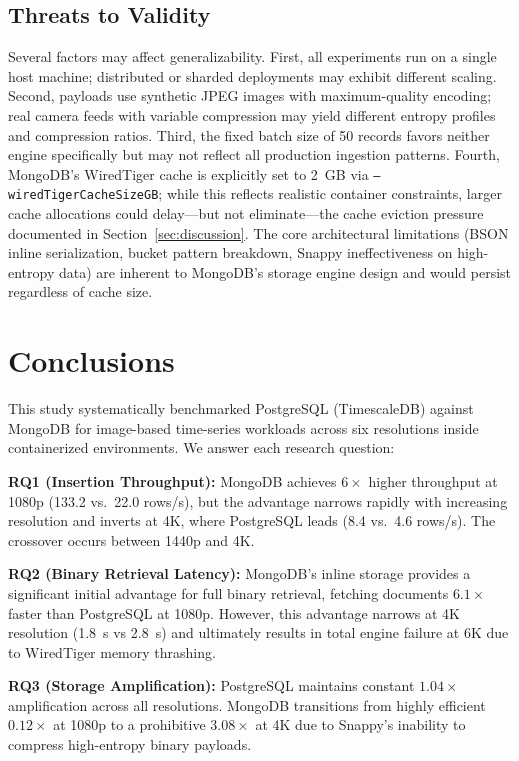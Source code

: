 \documentclass[conference]{IEEEtran}
\begin{document}
\subsection{Threats to Validity}
Several factors may affect generalizability. First, all experiments run on a single host machine; distributed or sharded deployments may exhibit different scaling. Second, payloads use synthetic JPEG images with maximum-quality encoding; real camera feeds with variable compression may yield different entropy profiles and compression ratios. Third, the fixed batch size of 50 records favors neither engine specifically but may not reflect all production ingestion patterns. Fourth, MongoDB's WiredTiger cache is explicitly set to 2~GB via \texttt{--wiredTigerCacheSizeGB}; while this reflects realistic container constraints, larger cache allocations could delay---but not eliminate---the cache eviction pressure documented in Section~\ref{sec:discussion}. The core architectural limitations (BSON inline serialization, bucket pattern breakdown, Snappy ineffectiveness on high-entropy data) are inherent to MongoDB's storage engine design and would persist regardless of cache size.

\section{Conclusions}
\label{sec:conclusions}

This study systematically benchmarked PostgreSQL (TimescaleDB) against MongoDB for image-based time-series workloads across six resolutions inside containerized environments. We answer each research question:

\textbf{RQ1 (Insertion Throughput):} MongoDB achieves $6\times$ higher throughput at 1080p (133.2 vs.\ 22.0 rows/s), but the advantage narrows rapidly with increasing resolution and inverts at 4K, where PostgreSQL leads (8.4 vs.\ 4.6 rows/s). The crossover occurs between 1440p and 4K.

\textbf{RQ2 (Binary Retrieval Latency):} MongoDB's inline storage provides a significant initial advantage for full binary retrieval, fetching documents $6.1\times$ faster than PostgreSQL at 1080p. However, this advantage narrows at 4K resolution (1.8~s vs 2.8~s) and ultimately results in total engine failure at 6K due to WiredTiger memory thrashing.

\textbf{RQ3 (Storage Amplification):} PostgreSQL maintains constant $1.04\times$ amplification across all resolutions. MongoDB transitions from highly efficient $0.12\times$ at 1080p to a prohibitive $3.08\times$ at 4K due to Snappy's inability to compress high-entropy binary payloads.
\end{document}
